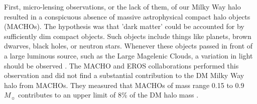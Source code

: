 \begin{figure}[h!]
\end{figure}

First, micro-lensing observations, or the lack of them, of our Milky Way halo resulted in a conspicuous absence of massive astrophysical compact halo objects (MACHOs).
The hypothesis was that 'dark matter' could be accounted for by sufficiently dim compact objects.
Such objects include things like planets, brown dwarves, black holes, or neutron stars.
Whenever these objects passed in front of a large luminous source, such as the Large Magelenic Clouds, a variation in light should be observed \cite{Hooper:DMHistory}.
The MACHO and EROS collaborations performed this observation and did not find a substantial contribution to the DM Milky Way halo from MACHOs.
They measured that MACHOs of mass range 0.15 to 0.9 $M_{\sun}$ contributes to an upper limit of 8\% of the DM halo mass \cite{Tisserand:MACHO}.

